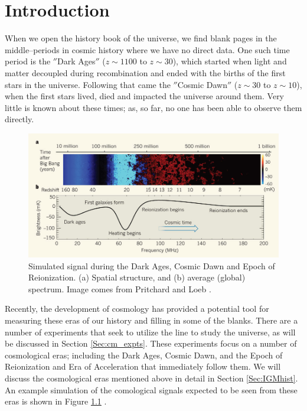 \chapter{Introduction}\label{Ch:Intro}

When we open the history book of the universe, we find blank pages in the middle--periods in cosmic history where we have no direct data. One such time period is the $''$Dark Ages$''$ ($z \sim 1100$ to $z \sim 30$), which started when light and matter decoupled during recombination and ended with the births of the first stars in the universe. Following that came the $''$Cosmic Dawn$''$ ($z\sim 30$ to $z\sim 10$), when the first stars lived, died and impacted the universe around them. Very little is known about these times; as, so far, no one has been able to observe them directly. 

\begin{figure}[htb]
\begin{center}
\includegraphics[width=0.95\linewidth]{Introduction/figures/pritchard_and_loeb_spectrum.jpg}
\caption{Simulated \cm signal during the Dark Ages, Cosmic Dawn and Epoch of Reionization. (a) Spatial structure, and (b) average (global) spectrum. Image comes from Pritchard and Loeb \cite{pritchard_2010}. }
\label{Fig:cm_hist}
\end{center}
\end{figure}

Recently, the development of \cm cosmology has provided a potential tool for measuring these eras of our history and filling in some of the blanks. There are a number of experiments that seek to utilize the \cm line to study the universe, as will be discussed in Section \ref{Sec:cm_expts}. These experiments focus on a number of cosmological eras; including the Dark Ages, Cosmic Dawn, and the Epoch of Reionization and Era of Acceleration that immediately follow them. We will discuss the cosmological eras mentioned above in detail in Section \ref{Sec:IGMhist}. An example simulation of the \cm comological signals expected to be seen from these eras is shown in Figure \ref{Fig:cm_hist} \cite{pritchard_2010}. 

